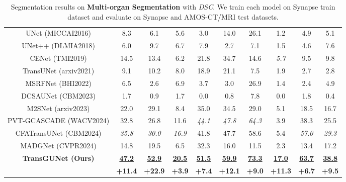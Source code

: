 \begin{table*}[t]
\begin{tabular}{c|c|cccccccc}
    \hline
    UNet \tiny{(MICCAI2016)}     & 8.3 & 6.1 & 5.6 & 3.0 & 14.0 & 26.1 & 1.2 & 4.9 & 5.1 \\
    UNet++ \tiny{(DLMIA2018)}    & 6.0 & 9.7 & 6.7 & 7.9 & 2.7 & 7.1 & 1.5 & 4.6 & 7.6 \\
    CENet \tiny{(TMI2019)}       & 14.5 & 13.4 & 6.2 & 21.8 & 34.7 & 14.6 & \textit{5.7} & 9.5 & 9.8 \\
    TransUNet \tiny{(arxiv2021)} & 9.1 & 10.2 & 8.0 & 18.9 & 21.1 & 7.5 & 1.9 & 2.7 & 2.8 \\
    MSRFNet \tiny{(BHI2022)}     & 6.5 & 2.6 & 6.9 & 3.7 & 3.0 & 26.9 & 1.4 & 2.4 & 4.9 \\
    DCSAUNet \tiny{(CBM2023)}    & 1.7 & 0.9 & 1.7 & 0.0 & 0.8 & 7.8 & 0.0 & 1.8 & 0.4 \\
    M2SNet \tiny{(arxiv2023)}    & 22.0 & 29.1 & 8.4 & 35.0 & 34.5 & 29.0 & 5.1 & 18.5 & 16.7 \\
    PVT-GCASCADE \tiny{(WACV2024)} & 32.8 & 26.8 & 11.6 & \textit{44.1} & \textit{47.8} & \textit{64.3} & 3.9 & 38.3 & 25.5 \\
    CFATransUNet \tiny{(CBM2024)} & \textit{35.8} & \textit{30.0} & \textit{16.9} & 41.8 & 47.7 & 58.6 & 5.4 & \textit{57.0} & \textit{29.3} \\
    MADGNet \tiny{(CVPR2024)}    & 14.8 & 19.5 & 6.5 & 32.3 & 16.0 & 11.5 & 2.3 & 13.4 & 17.2 \\
    \hline
    \multicolumn{1}{c|}{\multirow{2}{*}{\textbf{TransGUNet \tiny{(Ours)}}}} & \textbf{\underline{47.2}} & \textbf{\underline{52.9}} & \textbf{\underline{20.5}} & \textbf{\underline{51.5}} & \textbf{\underline{59.9}} & \textbf{\underline{73.3}} & \textbf{\underline{17.0}} & \textbf{\underline{63.7}} & \textbf{\underline{38.8}} \\ \cline{2-10}
    & \textbf{+11.4} & \textbf{+22.9} & \textbf{+3.9} & \textbf{+7.4} & \textbf{+12.1} & \textbf{+9.0} & \textbf{+11.3} & \textbf{+6.7} & \textbf{+9.5} \\
    \hline
    \end{tabular}
    \caption{Segmentation results on \textbf{Multi-organ Segmentation} with \textit{DSC}. We train each model on Synapse \cite{Synapse_dataset} train dataset and evaluate on Synapse \cite{Synapse_dataset} and AMOS-CT/MRI \cite{ji2022amos} test datasets.}
    \label{tab:comparison_sota_multiorgan_dsc_metrics}
\end{table*}


